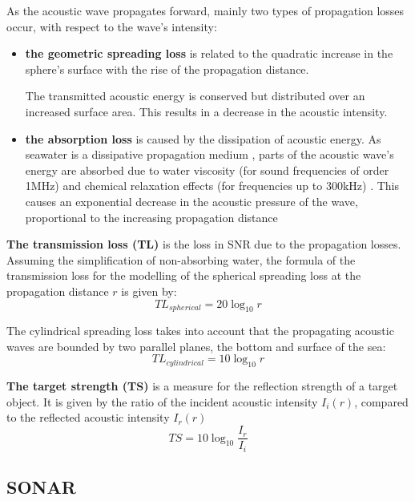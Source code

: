 \documentclass[11pt]{article}
\begin{document}
As the acoustic wave propagates forward, mainly two types of propagation losses occur, with respect to the wave’s intensity:
\begin{itemize}
\item \textbf{the geometric spreading loss} is related to the quadratic increase in the sphere’s surface with the rise of the propagation distance. 

The transmitted acoustic energy is conserved but distributed over an increased surface area. This results in a decrease in the acoustic intensity.
\item \textbf{the absorption loss} is caused by the dissipation of acoustic energy.
As seawater is a dissipative propagation medium \cite{lurton2002introduction}, parts of the acoustic wave’s energy are absorbed due to water viscosity (for sound frequencies of order 1MHz) and chemical relaxation effects (for frequencies up to 300kHz)  \cite{ainslie_principles_2010}. This causes an exponential decrease in the acoustic pressure of the wave, proportional to the increasing propagation distance
\end{itemize}

\textbf{The transmission loss (TL)} is the loss in SNR due to the propagation losses. Assuming the simplification of non-absorbing water, the formula of the transmission loss for the modelling of the spherical spreading loss at the propagation distance $r$  is given by:
\begin{equation}
TL_{spherical} = 20\log_{10}r
\label{eq:transmission_loss_sph}
\end{equation}

The cylindrical spreading loss takes into account that the propagating acoustic waves are bounded by two parallel planes, the bottom and surface of the sea:
\begin{equation}
TL_{cylindrical} = 10\log_{10}r
\label{eq:transmission_loss_cyl}
\end{equation}

\textbf{The target strength (TS)} is a measure for the reflection strength of a target object. It is given by the ratio of the incident acoustic intensity $I_{i}(r)$, compared to the reflected acoustic intensity $I_{r}(r)$
\begin{equation}
TS = 10\log_{10}\frac{I_r}{I_i}
\label{eq:target_strength_gen}
\end{equation}

\subsection{SONAR}
\end{document}
